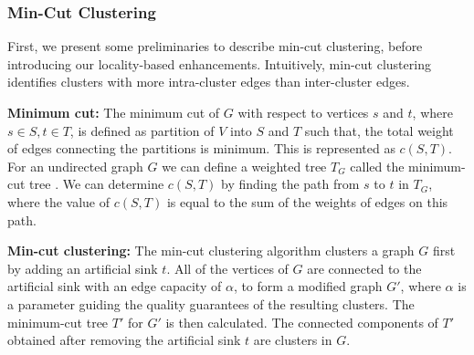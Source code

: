 \documentclass{sig-alternate}
\begin{document}
\subsubsection{Min-Cut Clustering}
First, we present some preliminaries to describe min-cut clustering, before introducing our locality-based enhancements. Intuitively, min-cut clustering identifies clusters with more intra-cluster edges than inter-cluster edges.

\medskip
\noindent\textbf{Minimum cut:} The minimum cut of $G$ with respect to vertices
$s$ and $t$, where $s \in S, t \in T$, is defined as partition of $V$ into $S$
and $T$ such that, the total weight of edges connecting the partitions is
minimum. This is represented as $c(S, T)$. For an undirected graph $G$ we can
define a weighted tree $T_G$ called the minimum-cut tree \cite{hu:mincut}. We can
determine $c(S, T)$ by finding the path from $s$ to $t$ in $T_G$, where the value
of $c(S, T)$ is equal to the sum of the weights of edges on this path.

\medskip
\noindent\textbf{Min-cut clustering:} The min-cut clustering algorithm
\cite{flake:cut-clustering} clusters a graph $G$ first by adding an artificial
sink $t$. All of the vertices of $G$ are connected to the artificial sink with an
edge capacity of $\alpha$, to form a modified graph $G'$, where $\alpha$ is a
parameter guiding the quality guarantees of the resulting clusters. The
minimum-cut tree $T'$ for $G'$ is then calculated. The connected components of
$T'$ obtained after removing the artificial sink $t$ are clusters in $G$.





\end{document}
